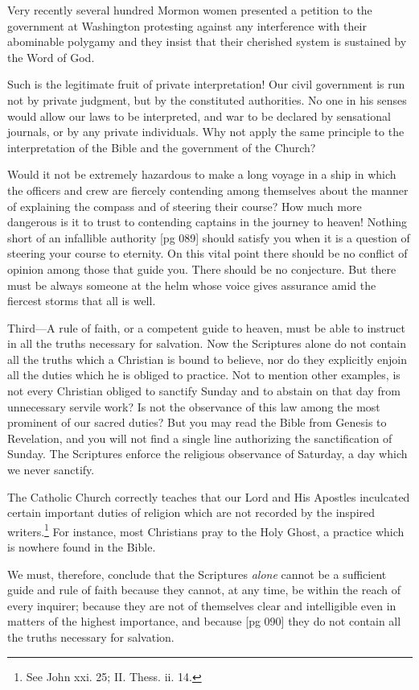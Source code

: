 Very recently several hundred Mormon women
presented a petition to the government at Washington
protesting against any interference with
their abominable polygamy and they insist that
their cherished system is sustained by the Word
of God.

Such is the legitimate fruit of private interpretation!
Our civil government is run not by private
judgment, but by the constituted authorities. No
one in his senses would allow our laws to be interpreted,
and war to be declared by sensational journals,
or by any private individuals. Why not apply
the same principle to the interpretation of the
Bible and the government of the Church?

Would it not be extremely hazardous to make a
long voyage in a ship in which the officers and crew
are fiercely contending among themselves about
the manner of explaining the compass and of steering
their course? How much more dangerous is
it to trust to contending captains in the journey to
heaven! Nothing short of an infallible authority
[pg 089]
should satisfy you when it is a question of steering
your course to eternity. On this vital point there
should be no conflict of opinion among those that
guide you. There should be no conjecture. But
there must be always someone at the helm whose
voice gives assurance amid the fiercest storms that
all is well.

Third—A rule of faith, or a competent guide
to heaven, must be able to instruct in all the truths
necessary for salvation. Now the Scriptures
alone do not contain all the truths which a Christian
is bound to believe, nor do they explicitly
enjoin all the duties which he is obliged to practice.
Not to mention other examples, is not every
Christian obliged to sanctify Sunday and to abstain
on that day from unnecessary servile work?
Is not the observance of this law among the most
prominent of our sacred duties? But you may
read the Bible from Genesis to Revelation, and
you will not find a single line authorizing the sanctification
of Sunday. The Scriptures enforce the
religious observance of Saturday, a day which
we never sanctify.

The Catholic Church correctly teaches that our
Lord and His Apostles inculcated certain important
duties of religion which are not recorded by
the inspired writers.\footnote{See John
xxi. 25; II. Thess. ii. 14.} For instance, most Christians
pray to the Holy Ghost, a practice which is
nowhere found in the Bible.

We must, therefore, conclude that the Scriptures
\emph{alone} cannot be a sufficient guide and rule
of faith because they cannot, at any time, be
within the reach of every inquirer; because they
are not of themselves clear and intelligible even
in matters of the highest importance, and because
[pg 090]
they do not contain all the truths necessary for
salvation.

